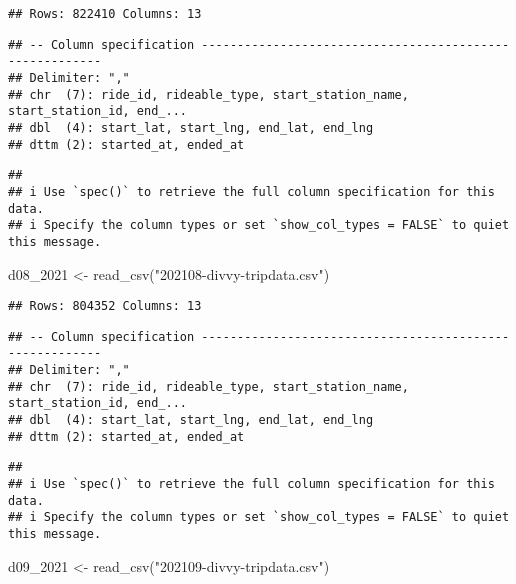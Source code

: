 \documentclass[
]{article}
\newenvironment{Shaded}{\begin{snugshade}}{\end{snugshade}}
\newcommand{\FunctionTok}[1]{\textcolor[rgb]{0.00,0.00,0.00}{#1}}
\newcommand{\NormalTok}[1]{#1}
\newcommand{\OtherTok}[1]{\textcolor[rgb]{0.56,0.35,0.01}{#1}}
\newcommand{\StringTok}[1]{\textcolor[rgb]{0.31,0.60,0.02}{#1}}
\begin{document}
\begin{verbatim}
## Rows: 822410 Columns: 13
\end{verbatim}

\begin{verbatim}
## -- Column specification --------------------------------------------------------
## Delimiter: ","
## chr  (7): ride_id, rideable_type, start_station_name, start_station_id, end_...
## dbl  (4): start_lat, start_lng, end_lat, end_lng
## dttm (2): started_at, ended_at
\end{verbatim}

\begin{verbatim}
## 
## i Use `spec()` to retrieve the full column specification for this data.
## i Specify the column types or set `show_col_types = FALSE` to quiet this message.
\end{verbatim}

\begin{Shaded}
\begin{Highlighting}[]
\NormalTok{d08\_2021 }\OtherTok{\textless{}{-}} \FunctionTok{read\_csv}\NormalTok{(}\StringTok{"202108{-}divvy{-}tripdata.csv"}\NormalTok{)}
\end{Highlighting}
\end{Shaded}

\begin{verbatim}
## Rows: 804352 Columns: 13
\end{verbatim}

\begin{verbatim}
## -- Column specification --------------------------------------------------------
## Delimiter: ","
## chr  (7): ride_id, rideable_type, start_station_name, start_station_id, end_...
## dbl  (4): start_lat, start_lng, end_lat, end_lng
## dttm (2): started_at, ended_at
\end{verbatim}

\begin{verbatim}
## 
## i Use `spec()` to retrieve the full column specification for this data.
## i Specify the column types or set `show_col_types = FALSE` to quiet this message.
\end{verbatim}

\begin{Shaded}
\begin{Highlighting}[]
\NormalTok{d09\_2021 }\OtherTok{\textless{}{-}} \FunctionTok{read\_csv}\NormalTok{(}\StringTok{"202109{-}divvy{-}tripdata.csv"}\NormalTok{)}
\end{Highlighting}
\end{Shaded}
\end{document}
